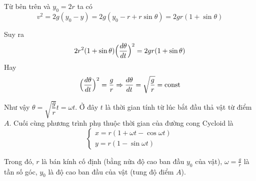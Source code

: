 Từ bên trên và $y_0 = 2r$ ta có \[v^2 = 2 g (y_0 - y) = 2 g (y_0 - r + r \sin \theta) = 2 g r ( 1 + \sin \theta)\]

Suy ra
\begin{equation*}
    2 r^2 (1 + \sin \theta) \Bigl( \frac{d \theta}{dt} \Bigr)^2 = 2 g r (1 + \sin \theta)
\end{equation*}
Hay
\begin{equation}
    \Bigl(\frac{d \theta}{dt}\Bigr)^2 = \frac{g}{r} \Rightarrow \frac{d \theta}{dt} = \sqrt{\frac{g}{r}} = \text{const}
\end{equation}

Như vậy $\theta = \sqrt{\dfrac{g}{r}} t = \omega t$. Ở đây $t$ là thời gian tính từ lúc bắt đầu thả vật từ điểm $A$. Cuối cùng phương trình phụ thuộc thời gian của đường cong Cycloid là
\begin{equation}
    \begin{cases}
        x = r (1 + \omega t - \cos \omega t) \\ y = r (1 - \sin \omega t)
    \end{cases}
\end{equation}

Trong đó, $r$ là bán kính cố định (bằng nửa độ cao ban đầu $y_0$ của vật), $\omega = \frac{g}{r}$ là tần số góc, $y_0$ là độ cao ban đầu của vật (tung độ điểm $A$).
